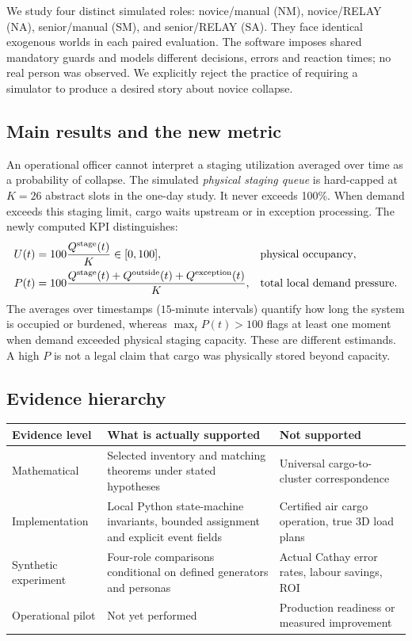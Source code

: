 \documentclass[10pt,a4paper]{article}
\theoremstyle{definition}\newtheorem{definition}[theorem]{Definition}
\theoremstyle{remark}\newtheorem{remark}[theorem]{Remark}
\newcommand{\1}{\mathbbm 1}
\begin{document}
We study four distinct simulated roles: novice/manual (NM), novice/RELAY (NA), senior/manual (SM), and senior/RELAY (SA). They face identical exogenous worlds in each paired evaluation. The software imposes shared mandatory guards and models different decisions, errors and reaction times; no real person was observed. We explicitly reject the practice of requiring a simulator to produce a desired story about novice collapse.

\subsection{Main results and the new metric}
An operational officer cannot interpret a staging utilization averaged over time as a probability of collapse. The simulated \emph{physical staging queue} is hard-capped at $K=26$ abstract slots in the one-day study. It never exceeds 100\%. When demand exceeds this staging limit, cargo waits upstream or in exception processing. The newly computed KPI distinguishes:
\begin{align}
U(t)&=100\frac{Q^{\rm stage}(t)}{K}\in[0,100], &&\text{physical occupancy},\\
P(t)&=100\frac{Q^{\rm stage}(t)+Q^{\rm outside}(t)+Q^{\rm exception}(t)}{K}, &&\text{total local demand pressure}.
\end{align}
The averages over timestamps ($15$-minute intervals) quantify how long the system is occupied or burdened, whereas $\max_t P(t)>100$ flags at least one moment when demand exceeded physical staging capacity. These are different estimands. A high $P$ is not a legal claim that cargo was physically stored beyond capacity.

\subsection{Evidence hierarchy}
\begin{center}\small\begin{tabularx}{\linewidth}{@{}p{.18\linewidth}X X@{}}\toprule
Evidence level & What is actually supported & Not supported\\\midrule
Mathematical & Selected inventory and matching theorems under stated hypotheses & Universal cargo-to-cluster correspondence\\
Implementation & Local Python state-machine invariants, bounded assignment and explicit event fields & Certified air cargo operation, true 3D load plans\\
Synthetic experiment & Four-role comparisons conditional on defined generators and personas & Actual Cathay error rates, labour savings, ROI\\
Operational pilot & Not yet performed & Production readiness or measured improvement\\\bottomrule
\end{tabularx}\end{center}
\end{document}
